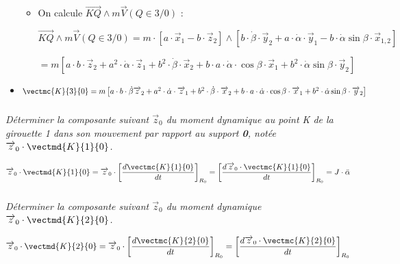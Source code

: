 \begin{multicols}{2}
\begin{corrige}
\begin{itemize}
\begin{itemize}
\item On calcule $\overrightarrow{KQ}\wedge m\overrightarrow{V}(Q\in 3/0)$ : 

$\overrightarrow{KQ}\wedge m\overrightarrow{V}(Q\in 3/0)=m\cdot \left[a\cdot \overrightarrow{x}_1-b\cdot \overrightarrow{z}_2\right]\wedge\left[b\cdot \dot{\beta}\cdot \overrightarrow{y}_2+a\cdot \dot{\alpha}\cdot \overrightarrow{y}_1-b\cdot\dot{\alpha} \sin\beta\cdot \overrightarrow{x}_{1,2}\right]$

$=m\left[a\cdot b\cdot \overrightarrow{z}_2+a^2\cdot \dot{\alpha}\cdot\overrightarrow{z}_1+b^2\cdot \dot{\beta}\cdot\overrightarrow{x}_2+b\cdot a\cdot \dot{\alpha}\cdot \cos\beta\cdot \overrightarrow{x}_1+b^2\cdot \dot{\alpha}\sin\beta\cdot \overrightarrow{y}_2\right]
$
\end{itemize}

\item
$
\vectmc{K}{3}{0}=m\left[a\cdot b\cdot\dot{\beta} \overrightarrow{z}_2+a^2\cdot \dot{\alpha}\cdot\overrightarrow{z}_1+b^2\cdot \dot{\beta}\cdot\overrightarrow{x}_2+b\cdot a\cdot \dot{\alpha}\cdot \cos\beta\cdot \overrightarrow{x}_1+b^2\cdot \dot{\alpha}\sin\beta\cdot \overrightarrow{y}_2\right]
$

\end{itemize}

\end{corrige}
\else
\fi


\subparagraph{} \textit{Déterminer la composante suivant $\overrightarrow{z}_0$ du moment dynamique au point K de la girouette 1 dans son mouvement par rapport au support \textbf{0}, notée $\overrightarrow{z}_0\cdot \vectmd{K}{1}{0}$.}

\ifprof
\begin{corrige}
\begin{align*}
\overrightarrow{z}_0\cdot \vectmd{K}{1}{0}=\overrightarrow{z}_0\cdot\left[\frac{d\vectmc{K}{1}{0}}{dt}\right]_{R_0}
=\left[\frac{d\overrightarrow{z}_0\cdot\vectmc{K}{1}{0}}{dt}\right]_{R_0}=J\cdot \ddot{\alpha}
\end{align*}
\end{corrige}
\else
\fi


\subparagraph{} \textit{Déterminer la composante suivant $\overrightarrow{z}_0$ du moment dynamique $\overrightarrow{z}_0\cdot \vectmd{K}{2}{0}$.}

\ifprof
\begin{corrige}
\begin{align*}
\overrightarrow{z}_0\cdot \vectmd{K}{2}{0}=\overrightarrow{z}_0\cdot\left[\frac{d\vectmc{K}{2}{0}}{dt}\right]_{R_0}
=\left[\frac{d\overrightarrow{z}_0\cdot\vectmc{K}{2}{0}}{dt}\right]_{R_0}
\end{align*}


\end{corrige}
\end{multicols}
